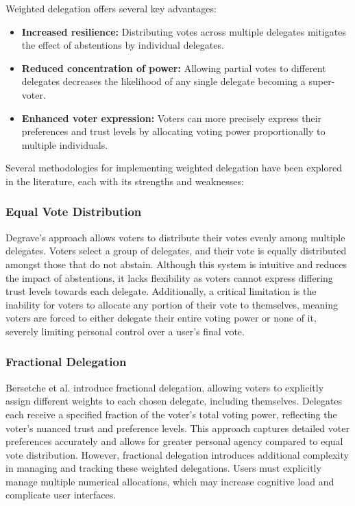 Weighted delegation offers several key advantages:
\begin{itemize}
  \item \textbf{Increased resilience:} Distributing votes across multiple delegates mitigates the effect of abstentions by individual delegates.
  \item \textbf{Reduced concentration of power:} Allowing partial votes to different delegates decreases the likelihood of any single delegate becoming a super-voter.
  \item \textbf{Enhanced voter expression:} Voters can more precisely express their preferences and trust levels by allocating voting power proportionally to multiple individuals.
\end{itemize}

Several methodologies for implementing weighted delegation have been explored in the literature, each with its strengths and weaknesses:

\subsubsection*{Equal Vote Distribution~\citep{degrave2014}}
Degrave's approach allows voters to distribute their votes evenly among multiple delegates. Voters select a group of delegates, and their vote is equally distributed amongst those that do not abstain.
Although this system is intuitive and reduces the impact of abstentions, it lacks flexibility as voters cannot express differing trust levels towards each delegate. Additionally, a critical limitation is the inability for voters to allocate any portion of their vote to themselves, meaning voters are forced to either delegate their entire voting power or none of it, severely limiting personal control over a user's final vote.

\subsubsection*{Fractional Delegation~\citep{bersetche2024}}
Bersetche et al. introduce fractional delegation, allowing voters to explicitly assign different weights to each chosen delegate, including themselves. Delegates each receive a specified fraction of the voter's total voting power, reflecting the voter's nuanced trust and preference levels. This approach captures detailed voter preferences accurately and allows for greater personal agency compared to equal vote distribution. However, fractional delegation introduces additional complexity in managing and tracking these weighted delegations. Users must explicitly manage multiple numerical allocations, which may increase cognitive load and complicate user interfaces.

